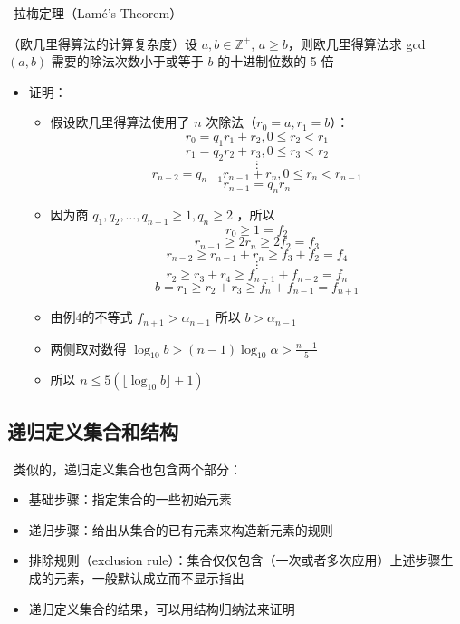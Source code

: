 \documentclass[UTF8]{report}
\theoremstyle{MyLineTheoremStyle} %
\theoremstyle{MyBlockTheoremStyle} %
\theoremstyle{MySubsubsectionStyle} %
\begin{document}
\textbullet\ 拉梅定理（Lamé’s Theorem）\par
（欧几里得算法的计算复杂度）设 $a, b \in \mathbb{Z}^+$, $a \geq b$，则欧几里得算法求 gcd$(a, b)$ 需要的除法次数小于或等于 $b$ 的十进制位数的 5 倍
\begin{itemize}
    \item 证明：
    \begin{itemize}
        \item 假设欧几里得算法使用了 $n$ 次除法（$r_0 = a, r_1 = b$）：
        \[
        r_0 = q_1r_1 + r_2, 0 \leq r_2 < r_1
        \]
        \[
        r_1 = q_2r_2 + r_3, 0 \leq r_3 < r_2
        \]
        \[
        \vdots
        \]
        \[
        r_{n-2} = q_{n-1}r_{n-1} + r_n, 0 \leq r_n < r_{n-1}
        \]
        \[
        r_{n-1} = q_nr_n
        \]
        \item 因为商 $q_1, q_2, \ldots , q_{n-1} \geq 1, q_n \geq 2$ ，所以
        \[
        r_0 \geq 1 = f_2
        \]
        \[
        r_{n-1} \geq 2r_n \geq 2f_2 = f_3
        \]
        \[
        r_{n-2} \geq r_{n-1} + r_n \geq f_3 + f_2 = f_4
        \]
        \[
        \vdots
        \]
        \[
        r_2 \geq r_3 + r_4 \geq f_{n-1} + f_{n-2} = f_n
        \]
        \[
        b = r_1 \geq r_2 + r_3 \geq f_n + f_{n-1} = f_{n+1}
        \]
        \item 由例4的不等式 $f_{n+1} > \alpha_{n-1}$ 所以 $b > \alpha_{n-1}$
        \item 两侧取对数得 $\log_{10} b > (n - 1) \log_{10} \alpha > \frac{n - 1}{5}$
        \item 所以 $n \leq 5(\lfloor \log_{10} b \rfloor + 1)$
    \end{itemize}
\end{itemize}

\subsection{递归定义集合和结构}
\textbullet\ 类似的，递归定义集合也包含两个部分：
\begin{itemize}
    \item 基础步骤：指定集合的一些初始元素
    \item 递归步骤：给出从集合的已有元素来构造新元素的规则
    \item 排除规则（exclusion rule）：集合仅仅包含（一次或者多次应用）上述步骤生成的元素，一般默认成立而不显示指出
    \item 递归定义集合的结果，可以用结构归纳法来证明
\end{itemize}
\end{document}
